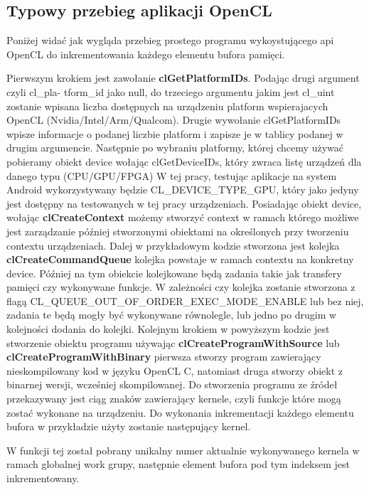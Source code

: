 \subsection{Typowy przebieg aplikacji OpenCL}
Poniżej widać jak wygląda przebieg prostego programu wykoystującego api OpenCL do inkrementowania każdego elementu bufora pamięci.



Pierwszym krokiem jest zawołanie \textbf{clGetPlatformIDs}. Podając drugi argument czyli cl\_pla- tform\_id jako null, do trzeciego argumentu jakim jest cl\_uint\* zostanie wpisana liczba dostępnych na urządzeniu platform wspierajacych OpenCL (Nvidia/Intel/Arm/Qualcom).
Drugie wywołanie clGetPlatformIDs wpisze informacje o podanej liczbie platform i zapisze je w tablicy podanej w drugim argumencie.
Następnie po wybraniu platformy, której chcemy używać pobieramy obiekt device wołając clGetDeviceIDs, który zwraca listę urządzeń dla danego typu (CPU/GPU/FPGA)
W tej pracy, testując aplikacje na system Android wykorzystywany będzie CL\_DEVICE\_TYPE\_GPU, który jako jedyny jest dostępny na testowanych w tej pracy urządzeniach.
Posiadając obiekt device, wołając \textbf{clCreateContext} możemy stworzyć context w ramach którego możliwe jest zarządzanie później stworzonymi obiektami na określonych przy tworzeniu contextu urządzeniach.
Dalej w przykładowym kodzie stworzona jest kolejka \textbf{clCreateCommandQueue} kolejka powstaje w ramach contextu na konkretny device. Później na tym obiekcie kolejkowane będą zadania takie jak transfery pamięci czy wykonywane funkcje. W zależności czy kolejka zostanie stworzona z flagą CL\_QUEUE\_OUT\_OF\_ORDER\_EXEC\_MODE\_ENABLE lub bez niej, zadania te będą mogły być wykonywane równolegle, lub jedno po drugim w kolejności dodania do kolejki.
Kolejnym krokiem w powyższym kodzie jest stworzenie obiektu programu używając \textbf{clCreateProgramWithSource} lub \textbf{clCreateProgramWithBinary} pierwsza stworzy program zawierający nieskompilowany kod w języku OpenCL C, natomiast druga stworzy obiekt z binarnej wersji, wcześniej skompilowanej. Do stworzenia programu ze źródeł przekazywany jest ciąg znaków zawierający kernele, czyli funkcje które mogą zostać wykonane na urządzeniu.
Do wykonania inkrementacji każdego elementu bufora w przykładzie użyty zostanie następujący kernel.

W funkcji tej został pobrany unikalny numer aktualnie wykonywanego kernela w ramach globalnej work grupy, następnie element bufora pod tym indeksem jest inkrementowany. 
